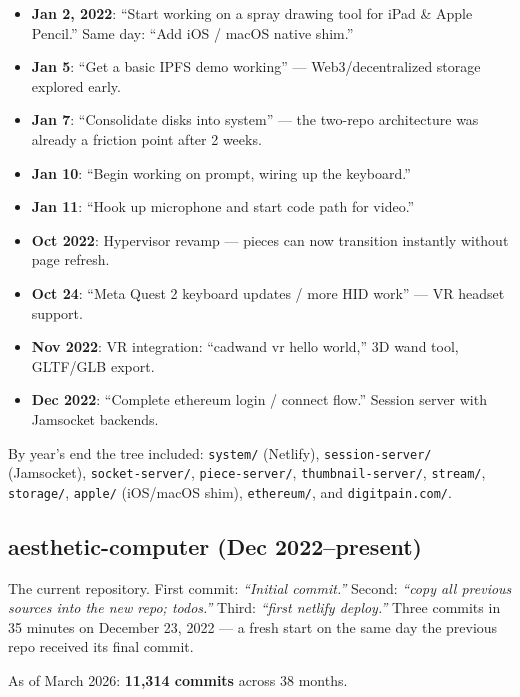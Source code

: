 \documentclass[10pt,letterpaper,twocolumn]{article}
\begin{document}
\begin{itemize}
  \item \textbf{Jan 2, 2022}: ``Start working on a spray drawing tool for iPad \& Apple Pencil.'' Same day: ``Add iOS / macOS native shim.''
  \item \textbf{Jan 5}: ``Get a basic IPFS demo working'' --- Web3/decentralized storage explored early.
  \item \textbf{Jan 7}: ``Consolidate disks into system'' --- the two-repo architecture was already a friction point after 2 weeks.
  \item \textbf{Jan 10}: ``Begin working on prompt, wiring up the keyboard.''
  \item \textbf{Jan 11}: ``Hook up microphone and start code path for video.''
  \item \textbf{Oct 2022}: Hypervisor revamp --- pieces can now transition instantly without page refresh.
  \item \textbf{Oct 24}: ``Meta Quest 2 keyboard updates / more HID work'' --- VR headset support.
  \item \textbf{Nov 2022}: VR integration: ``cadwand vr hello world,'' 3D wand tool, GLTF/GLB export.
  \item \textbf{Dec 2022}: ``Complete ethereum login / connect flow.'' Session server with Jamsocket backends.
\end{itemize}

By year's end the tree included: \texttt{system/} (Netlify), \texttt{session-server/} (Jamsocket), \texttt{socket-server/}, \texttt{piece-server/}, \texttt{thumbnail-server/}, \texttt{stream/}, \texttt{storage/}, \texttt{apple/} (iOS/macOS shim), \texttt{ethereum/}, and \texttt{digitpain.com/}.

\subsection{aesthetic-computer (Dec 2022--present)}

The current repository. First commit: \emph{``Initial commit.''} Second: \emph{``copy all previous sources into the new repo; todos.''} Third: \emph{``first netlify deploy.''} Three commits in 35 minutes on December 23, 2022 --- a fresh start on the same day the previous repo received its final commit.

As of March 2026: \textbf{11,314 commits} across 38 months.
\end{document}
